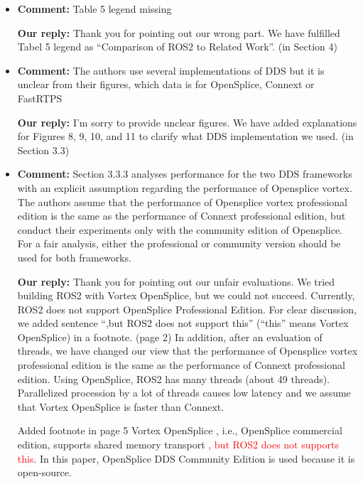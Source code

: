 \documentclass{article}
\begin{document}
\begin{itemize}
\item \begin{flushleft}
    \textbf{Comment:} Table 5 legend missing
  \end{flushleft}

  \begin{flushleft}
    \textbf{Our reply:} Thank you for pointing out our wrong part. We have fulfilled Tabel 5 legend as ``Comparison of ROS2 to Related Work''. (in Section 4)
  \end{flushleft}

\item \begin{flushleft}
    \textbf{Comment:} The authors use several implementations of DDS but it is unclear from their figures, which data is for OpenSplice, Connext or FastRTPS
  \end{flushleft}

  \begin{flushleft}
    \textbf{Our reply:} I'm sorry to provide unclear figures. We have added explanations for Figures 8, 9, 10, and 11 to clarify what DDS implementation we used. (in Section 3.3)
  \end{flushleft}

\item \begin{flushleft}
    \textbf{Comment:} Section 3.3.3 analyses performance for the two DDS frameworks with an explicit assumption regarding the performance of Opensplice vortex. The authors assume that the performance of Opensplice vortex professional edition is the same as the performance of Connext professional edition, but conduct their experiments only with the community edition of Opensplice. For a fair analysis, either the professional or community version should be used for both frameworks.
  \end{flushleft}

  \begin{flushleft}
    \textbf{Our reply:} Thank you for pointing out our unfair evaluations. 
    We tried building ROS2 with Vortex OpenSplice, but we could not succeed. 
    Currently, ROS2 does not support OpenSplice Professional Edition. For clear discussion, we added sentence ``,but ROS2 does not support this'' (``this'' means Vortex OpenSplice) in a footnote. (page 2)
    In addition, after an evaluation of threads, we have changed our view that the performance of Opensplice vortex professional edition is the same as the performance of Connext professional edition. 
    Using OpenSplice, ROS2 has many threads (about 49 threads). 
    Parallelized procession by a lot of threads causes low latency and we assume that Vortex OpenSplice is faster than Connext.
  \end{flushleft}
  \begin{itembox}[|]{Added footnote in page 5}
    Vortex OpenSplice \cite{ospl_vortex}, i.e., OpenSplice commercial edition, supports shared memory transport \textcolor{red}{, but ROS2 does not supports this}. In this paper, OpenSplice DDS Community Edition is used because it is open-source.
  \end{itembox}\\


\end{itemize}
\end{document}

